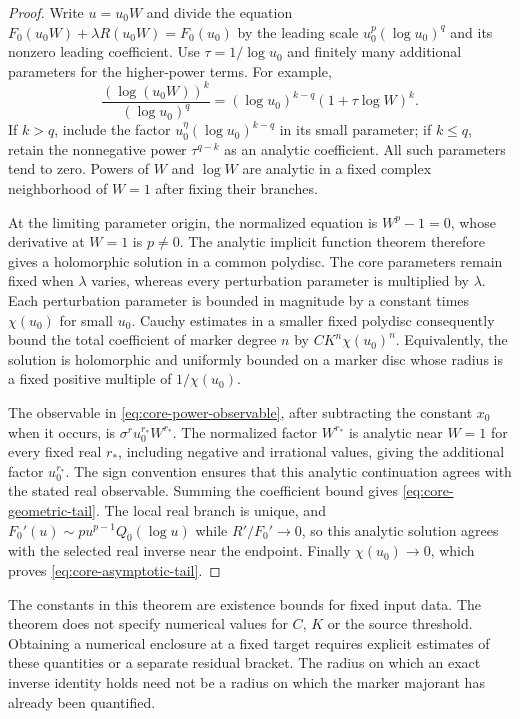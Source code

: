 \begin{proof}
Write $u=u_0W$ and divide the equation
$F_0(u_0W)+\lambda R(u_0W)=F_0(u_0)$ by the leading scale
$u_0^p(\log u_0)^q$ and its nonzero leading coefficient.
Use $\tau=1/\log u_0$ and finitely many additional parameters for the
higher-power terms. For example,
\[
 \frac{(\log(u_0W))^k}{(\log u_0)^q}
 =(\log u_0)^{k-q}(1+\tau\log W)^k.
\]
If $k>q$, include the factor
$u_0^\eta(\log u_0)^{k-q}$ in its small parameter; if $k\le q$,
retain the nonnegative power $\tau^{q-k}$ as an analytic coefficient.
All such parameters tend to zero. Powers of $W$ and $\log W$ are analytic
in a fixed complex neighborhood of $W=1$ after fixing their branches.

At the limiting parameter origin, the normalized equation is $W^p-1=0$,
whose derivative at $W=1$ is $p\ne0$. The analytic implicit function theorem
therefore gives a holomorphic solution in a common polydisc. The core
parameters remain fixed when $\lambda$ varies, whereas every perturbation
parameter is multiplied by $\lambda$. Each perturbation parameter is
bounded in magnitude by a constant times $\chi(u_0)$ for small $u_0$.
Cauchy estimates in a smaller fixed polydisc consequently bound the total
coefficient of marker degree $n$ by $C K^n\chi(u_0)^n$. Equivalently,
the solution is holomorphic and uniformly bounded on a marker disc whose
radius is a fixed positive multiple of $1/\chi(u_0)$.

The observable in \eqref{eq:core-power-observable}, after subtracting the
constant $x_0$ when it occurs, is $\sigma^r u_0^{r_*}W^{r_*}$.
The normalized factor $W^{r_*}$ is analytic near $W=1$ for every fixed
real $r_*$, including negative and irrational values, giving the additional
factor $u_0^{r_*}$. The sign convention ensures that this analytic continuation
agrees with the stated real observable. Summing the coefficient bound gives
\eqref{eq:core-geometric-tail}. The local real branch is unique, and
$F_0'(u)\sim p u^{p-1}Q_0(\log u)$ while $R'/F_0'\to0$,
so this analytic solution agrees with the selected real inverse near the
endpoint. Finally $\chi(u_0)\to0$, which proves
\eqref{eq:core-asymptotic-tail}.
\end{proof}

The constants in this theorem are existence bounds for fixed input data.
The theorem does not specify numerical values for $C$, $K$ or the source threshold. Obtaining a numerical enclosure at a fixed target requires explicit estimates of these quantities or a separate residual bracket. The radius on which an exact inverse identity holds need not be a radius on which the marker majorant has already been quantified.

